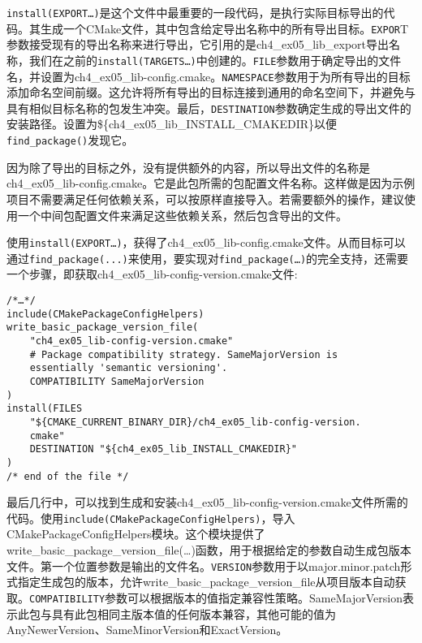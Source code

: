 \texttt{install(EXPORT…)}是这个文件中最重要的一段代码，是执行实际目标导出的代码。其生成一个CMake文件，其中包含给定导出名称中的所有导出目标。\texttt{EXPOR}T参数接受现有的导出名称来进行导出，它引用的是ch4\_ex05\_lib\_export导出名称，我们在之前的\texttt{install(TARGETS…)}中创建的。\texttt{FILE}参数用于确定导出的文件名，并设置为ch4\_ex05\_lib-config.cmake。\texttt{NAMESPACE}参数用于为所有导出的目标添加命名空间前缀。这允许将所有导出的目标连接到通用的命名空间下，并避免与具有相似目标名称的包发生冲突。最后，\texttt{DESTINATION}参数确定生成的导出文件的安装路径。设置为\$\{ch4\_ex05\_lib\_INSTALL\_CMAKEDIR\}以便\texttt{find\_package()}发现它。

\begin{tcolorbox}[colback=webgreen!5!white,colframe=webgreen!75!black,title=Note]
因为除了导出的目标之外，没有提供额外的内容，所以导出文件的名称是ch4\_ex05\_lib-config.cmake。它是此包所需的包配置文件名称。这样做是因为示例项目不需要满足任何依赖关系，可以按原样直接导入。若需要额外的操作，建议使用一个中间包配置文件来满足这些依赖关系，然后包含导出的文件。
\end{tcolorbox}

使用\texttt{install(EXPORT…)}，获得了ch4\_ex05\_lib-config.cmake文件。从而目标可以通过\texttt{find\_package(...)}来使用，要实现对\texttt{find\_package(…)}的完全支持，还需要一个步骤，即获取ch4\_ex05\_lib-config-version.cmake文件:

\begin{lstlisting}[style=styleCMake]
/*…*/
include(CMakePackageConfigHelpers)
write_basic_package_version_file(
	"ch4_ex05_lib-config-version.cmake"
	# Package compatibility strategy. SameMajorVersion is
	essentially 'semantic versioning'.
	COMPATIBILITY SameMajorVersion
)
install(FILES
	"${CMAKE_CURRENT_BINARY_DIR}/ch4_ex05_lib-config-version.
	cmake"
	DESTINATION "${ch4_ex05_lib_INSTALL_CMAKEDIR}"
)
/* end of the file */
\end{lstlisting}

最后几行中，可以找到生成和安装ch4\_ex05\_lib-config-version.cmake文件所需的代码。使用\texttt{include(CMakePackageConfigHelpers)}，导入CMakePackageConfigHelpers模块。这个模块提供了write\_basic\_package\_version\_file(…)函数，用于根据给定的参数自动生成包版本文件。第一个位置参数是输出的文件名。\texttt{VERSION}参数用于以major.minor.patch形式指定生成包的版本，允许write\_basic\_package\_version\_file从项目版本自动获取。\texttt{COMPATIBILITY}参数可以根据版本的值指定兼容性策略。SameMajorVersion表示此包与具有此包相同主版本值的任何版本兼容，其他可能的值为AnyNewerVersion、SameMinorVersion和ExactVersion。

